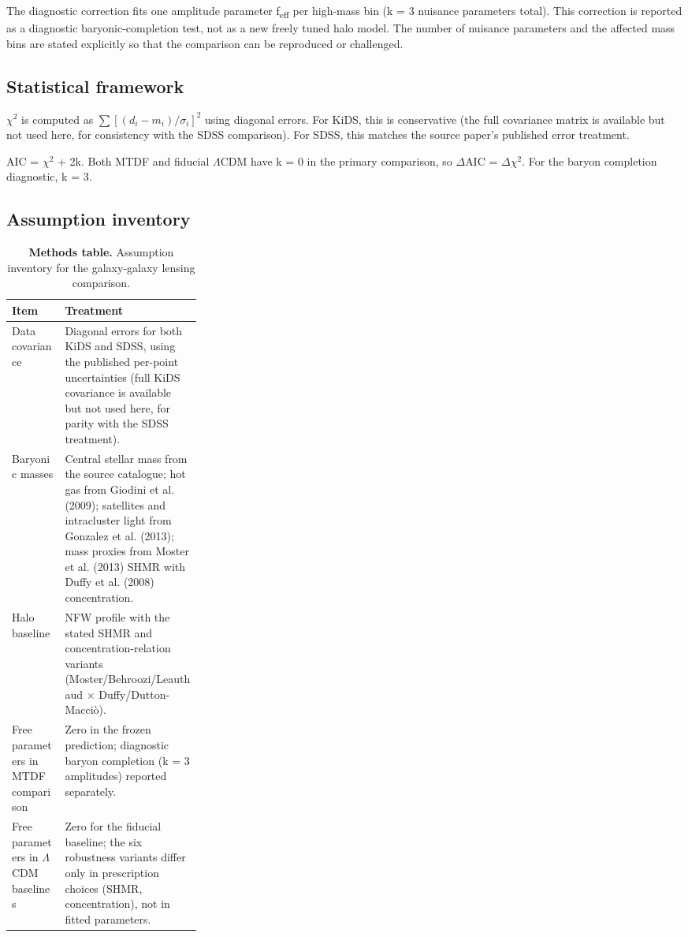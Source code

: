\documentclass[11pt,a4paper]{article}
\begin{document}
The diagnostic correction fits one amplitude parameter f\textsubscript{eff} per high-mass bin (k = 3 nuisance parameters total). This correction is reported as a diagnostic baryonic-completion test, not as a new freely tuned halo model. The number of nuisance parameters and the affected mass bins are stated explicitly so that the comparison can be reproduced or challenged.

\subsection{Statistical framework}
$\chi$$^{2}$ is computed as \(\sum [(d_i - m_i)/\sigma_i]^2\) using diagonal errors. For KiDS, this is conservative (the full covariance matrix is available but not used here, for consistency with the SDSS comparison). For SDSS, this matches the source paper's published error treatment.

AIC = $\chi$$^{2}$ + 2k. Both MTDF and fiducial $\Lambda$CDM have k = 0 in the primary comparison, so $\Delta$AIC = $\Delta$$\chi$$^{2}$. For the baryon completion diagnostic, k = 3.

\subsection{Assumption inventory}
\begin{table}[H]
\centering
\footnotesize
\caption{\textbf{Methods table.} Assumption inventory for the galaxy-galaxy lensing comparison.}
\begin{tabularx}{\linewidth}{p{0.28\linewidth}>{\RaggedRight\arraybackslash}X}
\toprule
\textbf{Item} & \textbf{Treatment} \tabularnewline
\midrule
Data covariance & Diagonal errors for both KiDS and SDSS, using the published per-point uncertainties (full KiDS covariance is available but not used here, for parity with the SDSS treatment). \tabularnewline
Baryonic masses & Central stellar mass from the source catalogue; hot gas from Giodini et al. (2009); satellites and intracluster light from Gonzalez et al. (2013); mass proxies from Moster et al. (2013) SHMR with Duffy et al. (2008) concentration. \tabularnewline
Halo baseline & NFW profile with the stated SHMR and concentration-relation variants (Moster/Behroozi/Leauthaud $\times$ Duffy/Dutton-Macci\`o). \tabularnewline
Free parameters in MTDF comparison & Zero in the frozen prediction; diagnostic baryon completion (k = 3 amplitudes) reported separately. \tabularnewline
Free parameters in $\Lambda$CDM baselines & Zero for the fiducial baseline; the six robustness variants differ only in prescription choices (SHMR, concentration), not in fitted parameters. \tabularnewline
\bottomrule
\end{tabularx}
\end{table}
\end{document}
